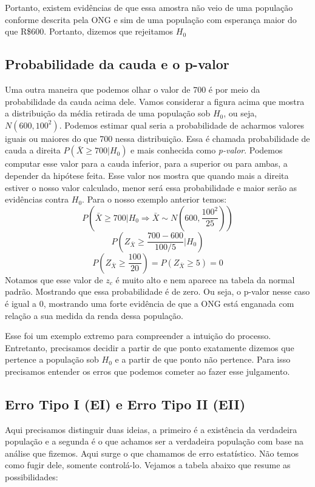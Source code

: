 \documentclass[
  letterpaper,
  DIV=11,
  numbers=noendperiod]{scrartcl}
\begin{document}
Portanto, existem evidências de que essa amostra não veio de uma
população conforme descrita pela ONG e sim de uma população com
esperança maior do que R\$600. Portanto, dizemos que rejeitamos \(H_0\)

\subsection{Probabilidade da cauda e o
p-valor}\label{probabilidade-da-cauda-e-o-p-valor}

Uma outra maneira que podemos olhar o valor de 700 é por meio da
probabilidade da cauda acima dele. Vamos considerar a figura acima que
mostra a distribuição da média retirada de uma população sob \(H_0\), ou
seja, \(N(600,100^2)\). Podemos estimar qual seria a probabilidade de
acharmos valores iguais ou maiores do que 700 nessa distribuição. Essa é
chamada probabilidade de cauda a direita \(P(\bar{X}\geq 700|H_0)\) e
mais conhecida como \textit{p-valor}. Podemos computar esse valor para a
cauda inferior, para a superior ou para ambas, a depender da hipótese
feita. Esse valor nos mostra que quando mais a direita estiver o nosso
valor calculado, menor será essa probabilidade e maior serão as
evidências contra \(H_0\). Para o nosso exemplo anterior temos:
\[P(\bar{X}\geq 700|H_0 \Rightarrow \bar{X} \sim N(600,\frac{100^2}{25}))\]
\[P(Z_{\bar{X}}\geq \frac{700-600}{100/5}|H_0)\]
\[P(Z_{\bar{X}} \geq  \frac{100}{20})=P(Z_{\bar{X}} \geq 5)=0\] Notamos
que esse valor de \(z_c\) é muito alto e nem aparece na tabela da normal
padrão. Mostrando que essa probabilidade é de zero. Ou seja, o p-valor
nesse caso é igual a 0, mostrando uma forte evidência de que a ONG está
enganada com relação a sua medida da renda dessa população.

Esse foi um exemplo extremo para compreender a intuição do processo.
Entretanto, precisamos decidir a partir de que ponto exatamente dizemos
que pertence a população sob \(H_0\) e a partir de que ponto não
pertence. Para isso precisamos entender os erros que podemos cometer ao
fazer esse julgamento.

\subsection{Erro Tipo I (EI) e Erro Tipo II
(EII)}\label{erro-tipo-i-ei-e-erro-tipo-ii-eii}

Aqui precisamos distinguir duas ideias, a primeiro é a existência da
verdadeira população e a segunda é o que achamos ser a verdadeira
população com base na análise que fizemos. Aqui surge o que chamamos de
erro estatístico. Não temos como fugir dele, somente controlá-lo.
Vejamos a tabela abaixo que resume as possibilidades:
\end{document}
